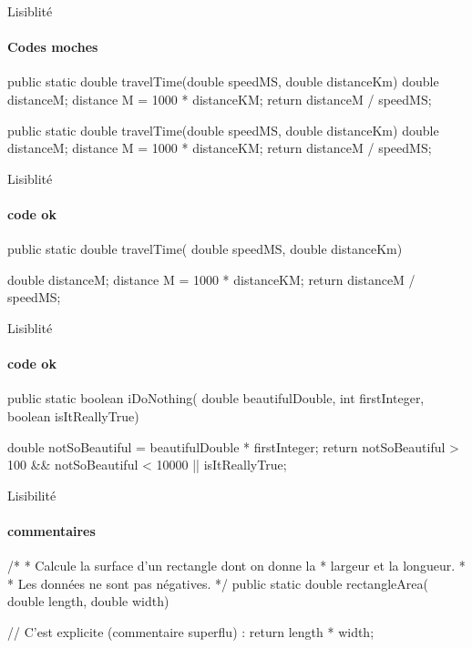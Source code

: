 \begin{frame}[fragile]{Lisiblité}
  \framesubtitle{Codes moches}
  \begin{java}
public static double travelTime(double speedMS, double distanceKm) {
double distanceM;
distance M = 1000 * distanceKM;
return distanceM / speedMS;
}
\end{java}

\begin{java}
public static double travelTime(double speedMS, double distanceKm) {
  double distanceM;
    distance M = 1000 * distanceKM; return distanceM / speedMS; }
  \end{java}
\end{frame}

\begin{frame}[fragile]{Lisiblité}
  \framesubtitle{code ok}
  \begin{java}
public static double travelTime(
    double speedMS, double distanceKm) {

  double distanceM;
  distance M = 1000 * distanceKM;
  return distanceM / speedMS;
}
  \end{java}
\end{frame}
\begin{frame}[fragile]{Lisiblité}
  \framesubtitle{code ok}
  \begin{java}
public static boolean iDoNothing(
    double beautifulDouble, int firstInteger,
    boolean isItReallyTrue) {

  double notSoBeautiful = beautifulDouble * firstInteger;
  return notSoBeautiful > 100 && notSoBeautiful < 10000
      || isItReallyTrue;
}
  \end{java}
\end{frame}

\begin{frame}[fragile]{Lisibilité}
  \framesubtitle{commentaires}
  \begin{java}
/* 
 * Calcule la surface d'un rectangle dont on donne la
 * largeur et la longueur.
 * 
 * Les données ne sont pas négatives.
 */
public static double rectangleArea(
    double length, double width) {

  // C'est explicite (commentaire superflu) :
  return length * width;
}
  \end{java}
\end{frame}

